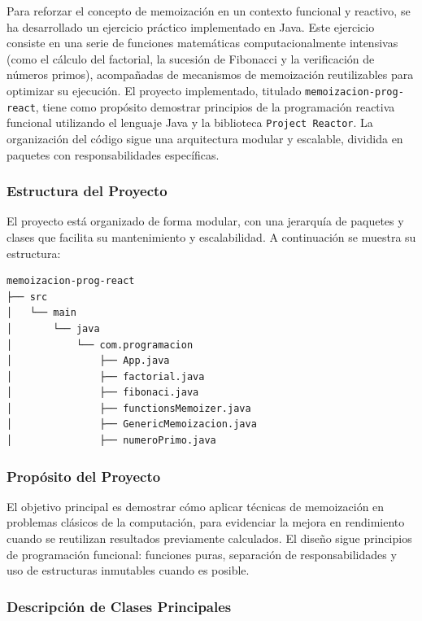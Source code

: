 Para reforzar el concepto de memoización en un contexto funcional y reactivo, se ha desarrollado un ejercicio práctico implementado en Java. Este ejercicio consiste en una serie de funciones matemáticas computacionalmente intensivas (como el cálculo del factorial, la sucesión de Fibonacci y la verificación de números primos), acompañadas de mecanismos de memoización reutilizables para optimizar su ejecución.
El proyecto implementado, titulado \texttt{memoizacion-prog-react}, tiene como propósito demostrar principios de la programación reactiva funcional utilizando el lenguaje Java y la biblioteca \texttt{Project Reactor}. La organización del código sigue una arquitectura modular y escalable, dividida en paquetes con responsabilidades específicas.

\subsubsection{Estructura del Proyecto}

El proyecto está organizado de forma modular, con una jerarquía de paquetes y clases que facilita su mantenimiento y escalabilidad. A continuación se muestra su estructura:

\begin{verbatim}
memoizacion-prog-react
├── src
│   └── main
│       └── java
│           └── com.programacion
│               ├── App.java
│               ├── factorial.java
│               ├── fibonaci.java
│               ├── functionsMemoizer.java
│               ├── GenericMemoizacion.java
│               ├── numeroPrimo.java
\end{verbatim}

\subsubsection{Propósito del Proyecto}

El objetivo principal es demostrar cómo aplicar técnicas de memoización en problemas clásicos de la computación, para evidenciar la mejora en rendimiento cuando se reutilizan resultados previamente calculados. El diseño sigue principios de programación funcional: funciones puras, separación de responsabilidades y uso de estructuras inmutables cuando es posible.

\subsubsection{Descripción de Clases Principales}

